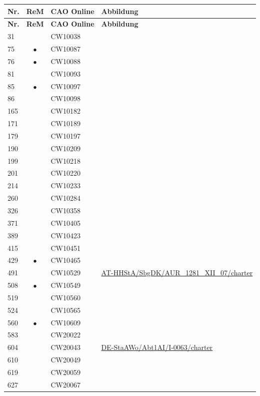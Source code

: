 \begin{xltabular}{\linewidth}{@{} l c l X @{}}
\toprule
\textbf{Nr.}
	& \textbf{ReM}
	& \textbf{CAO Online}
	& \textbf{Abbildung}
	\\
\midrule
\endfirsthead

\textbf{Nr.}
	& \textbf{ReM}
	& \textbf{CAO Online}
	& \textbf{Abbildung}
	\\
\midrule
\endhead

\bottomrule
\endlastfoot

31		&           & CW10038 \\
75		& $\bullet$ & CW10087 \\
76		& $\bullet$ & CW10088 \\
81		&           & CW10093 \\
85		& $\bullet$ & CW10097 \\
86		&           & CW10098 \\
165		&           & CW10182 \\
171		&           & CW10189 \\
179		&           & CW10197 \\
190		&           & CW10209 \\
199		&           & CW10218 \\
201		&           & CW10220 \\
214		&           & CW10233 \\
260		&           & CW10284 \\
326		&           & CW10358 \\
371		&           & CW10405 \\
389		&           & CW10423 \\
415		&           & CW10451 \\
429		& $\bullet$ & CW10465 \\
491		&           & CW10529
		& \url{AT-HHStA/SbgDK/AUR_1281_XII_07/charter}
	\\
508		& $\bullet$ & CW10549 \\
519		&           & CW10560 \\
524		&           & CW10565 \\
560		& $\bullet$ & CW10609 \\
583		&           & CW20022 \\
604		&           & CW20043
		& \url{DE-StaAWo/Abt1AI/I-0063/charter}
	\\
610		&           & CW20049 \\
619		&           & CW20059 \\
627		&           & CW20067 \\

\end{xltabular}

